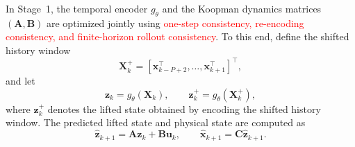 \documentclass[journal]{IEEEtran}
\newcommand{\vx}{\mathbf{x}}
\newcommand{\vu}{\mathbf{u}}
\newcommand{\vz}{\mathbf{z}}
\newcommand{\mA}{\mathbf{A}}
\newcommand{\mB}{\mathbf{B}}
\newcommand{\mC}{\mathbf{C}}
\newcommand{\mX}{\mathbf{X}}
\begin{document}
In Stage~1, the temporal encoder $g_\theta$ and the Koopman dynamics matrices $(\mA,\mB)$ are optimized jointly using \textcolor{red}{one-step consistency, re-encoding consistency, and finite-horizon rollout consistency}. To this end, define the shifted history window
\begin{equation}
    \mX_k^{+} = [\vx_{k-P+2}^\top,\ldots,\vx_{k+1}^\top]^\top,
\end{equation}
and let
\begin{equation}
    \vz_k = g_\theta(\mX_k), \qquad
    \vz_k^{+} = g_\theta(\mX_k^{+}),
\end{equation}
where $\vz_k^{+}$ denotes the lifted state obtained by encoding the shifted history window. The predicted lifted state and physical state are computed as
\begin{equation}
    \hat{\vz}_{k+1} = \mA \vz_k + \mB \vu_k,
    \qquad
    \hat{\vx}_{k+1} = \mC \hat{\vz}_{k+1}.
\end{equation}
\end{document}
